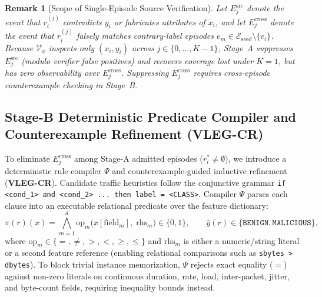 \documentclass[11pt,letterpaper,onecolumn]{article}
\newtheorem{remark}{Remark}
\begin{document}
\begin{remark}[Scope of Single-Episode Source Verification]
Let $E_j^{\mathrm{src}}$ denote the event that $r_i^{(j)}$ contradicts $y_i$ or fabricates attributes of $x_i$, and let $E_j^{\mathrm{cross}}$ denote the event that $r_i^{(j)}$ falsely matches contrary-label episodes $e_m \in \mathcal{E}_{\mathrm{seed}} \setminus \{e_i\}$. Because $\mathcal{V}_\phi$ inspects only $(x_i, y_i)$ across $j \in \{0, \dots, K-1\}$, Stage~A suppresses $E_j^{\mathrm{src}}$ (modulo verifier false positives) and recovers coverage lost under $K=1$, but has zero observability over $E_j^{\mathrm{cross}}$. Suppressing $E_j^{\mathrm{cross}}$ requires cross-episode counterexample checking in Stage~B.
\end{remark}

\subsection{Stage-B Deterministic Predicate Compiler and Counterexample Refinement (VLEG-CR)}
\label{sec:counterexample_gate}
To eliminate $E_j^{\mathrm{cross}}$ among Stage-A admitted episodes ($r_i^* \neq \emptyset$), we introduce a deterministic rule compiler $\Psi$ and counterexample-guided inductive refinement (\textbf{VLEG-CR}). Candidate traffic heuristics follow the conjunctive grammar \texttt{if <cond\_1> and <cond\_2> ... then label = <CLASS>}. Compiler $\Psi$ parses each clause into an executable relational predicate over the feature dictionary:
\begin{equation}
\label{eq:compiler_pred}
    \pi(r)(x) = \bigwedge_{m=1}^{d} \mathrm{op}_m\big(x[\mathrm{field}_m],\; \mathrm{rhs}_m\big) \in \{0, 1\}, \qquad \hat{y}(r) \in \{\texttt{BENIGN}, \texttt{MALICIOUS}\},
\end{equation}
where $\mathrm{op}_m \in \{=, \neq, >, <, \ge, \le\}$ and $\mathrm{rhs}_m$ is either a numeric/string literal or a second feature reference (enabling relational comparisons such as \texttt{sbytes > dbytes}). To block trivial instance memorization, $\Psi$ rejects exact equality ($=$) against non-zero literals on continuous duration, rate, load, inter-packet, jitter, and byte-count fields, requiring inequality bounds instead.
\end{document}
